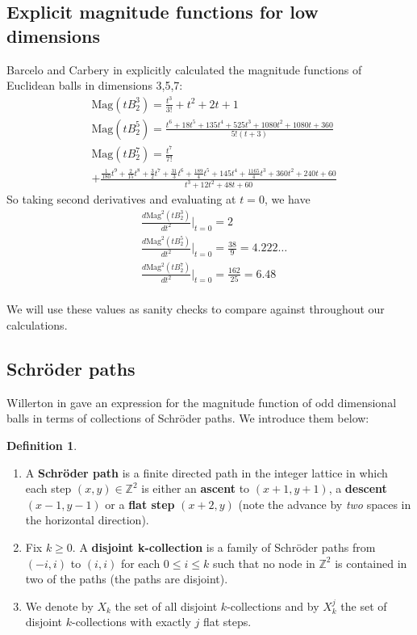 \documentclass[11pt]{article}
\newcommand{\Z}{\mathbb{Z}}
\theoremstyle{definition}
\newtheorem*{defn}{Definition}
\theoremstyle{definition}
\theoremstyle{plain}
\theoremstyle{plain}
\theoremstyle{plain}
\theoremstyle{definition}
\begin{document}
\subsection*{Explicit magnitude functions for low dimensions}

Barcelo and Carbery in \cite{barcelo_magnitudes_2016} explicitly calculated the magnitude functions of Euclidean balls in dimensions 3,5,7:
\begin{align*}
&\text{Mag}(tB_2^3) = \frac{t^3}{3!}+t^2+2t+1 \\
&\text{Mag}(tB_2^5) = \frac{t^6+18t^5+135t^4+525t^3+1080t^2+1080t+360}{5!(t+3)} \\
&\text{Mag}(tB_2^7) = \frac{t^7}{7!} \\
&+ \frac{\frac{1}{180}t^9+\frac{2}{15}t^8+\frac{3}{2}t^7+\frac{31}{3}t^6+\frac{189}{4}t^5+145t^4+\frac{1165}{4}t^3+360t^2+240t+60}{t^3+12t^2+48t+60}
\end{align*}
So taking second derivatives and evaluating at $t = 0$, we have
\begin{align*}
&\frac{d\text{Mag}^2(tB_2^3)}{dt^2}\big\vert_{t=0} = 2 \\
&\frac{d\text{Mag}^2(tB_2^5)}{dt^2}\big\vert_{t=0} = \frac{38}{9} = 4.222\dots \\
&\frac{d\text{Mag}^2(tB_2^7)}{dt^2}\big\vert_{t=0} = \frac{162}{25} = 6.48 \\
\end{align*}

We will use these values as sanity checks to compare against throughout our calculations.

\subsection*{Schröder paths}

Willerton in \cite{willerton_magnitude_2017} gave an expression for the magnitude function of odd dimensional balls in terms of collections of Schröder paths. We introduce them below:
\begin{defn}
\begin{enumerate}[label=$\bullet$]
\item A \textbf{Schröder path} is a finite directed path in the integer lattice in which each step $(x,y)\in\Z^2$ is either an \textbf{ascent} to $(x+1,y+1)$, a \textbf{descent} $(x-1,y-1)$ or a \textbf{flat step} $(x+2,y)$ (note the advance by \emph{two} spaces in the horizontal direction).
\item Fix $k\geq0$. A \textbf{disjoint k-collection} is a family of Schröder paths from $(-i,i)$ to $(i,i)$ for each $0\leq i\leq k$ such that no node in $\Z^2$ is contained in two of the paths (the paths are disjoint).
\item We denote by $X_k$ the set of all disjoint $k$-collections and by $X_k^j$ the set of disjoint $k$-collections with exactly $j$ flat steps.
\end{enumerate}
\end{defn}
\end{document}
